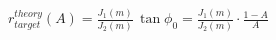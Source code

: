 \documentclass[border=1pt]{standalone}
\begin{document}
\fontsize{14}{16.8}\selectfont
\(\displaystyle r_{target}^{theory}(A) = \frac{J_1(m)}{J_2(m)}\,\tan\phi_0 = \frac{J_1(m)}{J_2(m)}\cdot\frac{1-A}{A}\)
\end{document}
